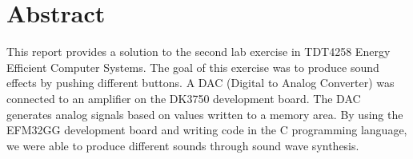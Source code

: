 \section{Abstract}

This report provides a solution to the second lab exercise in TDT4258 Energy Efficient Computer Systems.
The goal of this exercise was to produce sound effects by pushing different buttons.
A DAC (Digital to Analog Converter) was connected to an amplifier on the DK3750 development board.
The DAC generates analog signals based on values written to a memory area.
By using the EFM32GG development board and writing code in the C programming language, we were able to produce different sounds through sound wave synthesis.
